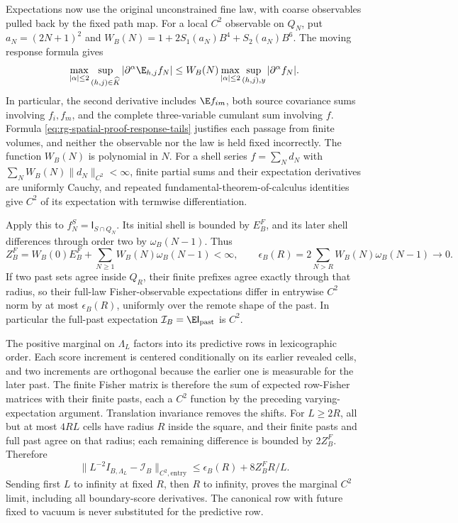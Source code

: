 Expectations now use the original unconstrained fine law, with coarse
observables pulled back by the fixed path map. For a local \(C^2\)
observable on \(Q_N\), put \(a_N=(2N+1)^2\) and
\(W_B(N)=1+2S_1(a_N)B^4+S_2(a_N)B^6\). The moving response formula gives
\begin{equation}
 \max_{|\alpha|\le2}\sup_{(h,j)\in\widehat K}
      |\partial^\alpha\E_{h,j}f_N|
 \le W_B(N)\max_{|\alpha|\le2}\sup_{(h,j),y}|\partial^\alpha f_N|.
 \label{eq:rg-spatial-proof-varying-expectation-bound}
\end{equation}
In particular, the second derivative includes \(\E f_{im}\), both source
covariance sums involving \(f_i,f_m\), and the complete three-variable
cumulant sum involving \(f\). Formula
\cref{eq:rg-spatial-proof-response-tails} justifies each passage from finite
volumes, and neither the observable nor the law is held fixed incorrectly.
The function \(W_B(N)\) is polynomial in \(N\). For a shell series
\(f=\sum_Nd_N\) with \(\sum_NW_B(N)\|d_N\|_{C^2}<\infty\), finite partial
sums and their expectation derivatives are uniformly Cauchy, and repeated
fundamental-theorem-of-calculus identities give \(C^2\) of its expectation
with termwise differentiation.

Apply this to \(f_N^S=\mathsf I_{S\cap Q_N}\). Its initial shell is bounded
by \(E_B^F\), and its later shell differences through order two by
\(\omega_B(N-1)\). Thus
\begin{equation}
 Z_B^F=W_B(0)E_B^F+\sum_{N\ge1}W_B(N)\omega_B(N-1)<\infty,
 \qquad
 \epsilon_B(R)=2\sum_{N>R}W_B(N)\omega_B(N-1)\longrightarrow0.
 \label{eq:rg-spatial-proof-fisher-expectation-tails}
\end{equation}
If two past sets agree inside \(Q_R\), their finite prefixes agree exactly
through that radius, so their full-law Fisher-observable expectations
differ in entrywise \(C^2\) norm by at most \(\epsilon_B(R)\), uniformly
over the remote shape of the past. In particular the full-past expectation
\(\mathcal I_B=\E\mathsf I_{\mathrm{past}}\) is \(C^2\).

The positive marginal on \(\Lambda_L\) factors into its predictive rows in
lexicographic order. Each score increment is centered conditionally on its
earlier revealed cells, and two increments are orthogonal because the
earlier one is measurable for the later past. The finite Fisher matrix is
therefore the sum of expected row-Fisher matrices with their finite pasts,
each a \(C^2\) function by the preceding varying-expectation argument.
Translation invariance removes the shifts. For \(L\ge2R\), all but at most
\(4RL\) cells have radius \(R\) inside the square, and their finite pasts
and full past agree on that radius; each remaining difference is bounded by
\(2Z_B^F\). Therefore
\begin{equation}
 \|L^{-2}I_{B,\Lambda_L}-\mathcal I_B\|_{C^2,\mathrm{entry}}
 \le\epsilon_B(R)+8Z_B^FR/L.
 \label{eq:rg-spatial-proof-actual-fisher-limit}
\end{equation}
Sending first \(L\) to infinity at fixed \(R\), then \(R\) to infinity,
proves the marginal \(C^2\) limit, including all boundary-score
derivatives. The canonical row with future fixed to vacuum is never
substituted for the predictive row.

